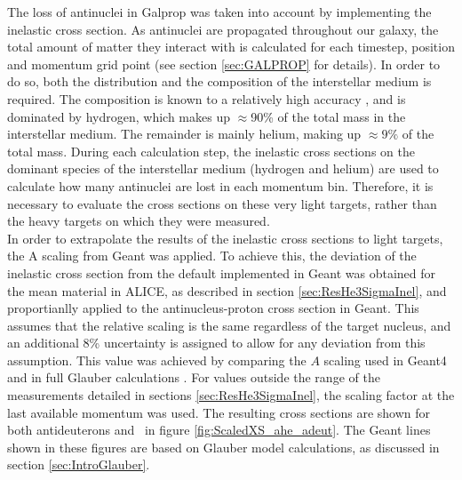 The loss of antinuclei in Galprop was taken into account by implementing the inelastic cross section. As antinuclei are propagated throughout our galaxy, the total amount of matter they interact with is calculated for each timestep, position and momentum grid point (see section \ref{sec:GALPROP} for details). In order to do so, both the distribution and the composition of the interstellar medium is required. The composition is known to a relatively high accuracy \cite{ISM_composition}, and is dominated by hydrogen, which makes up $\approx$90\% of the total mass in the interstellar medium. The remainder is mainly helium, making up $\approx 9\%$ of the total mass. During each calculation step, the inelastic cross sections on the dominant species of the interstellar medium (hydrogen and helium) are used to calculate how many antinuclei are lost in each momentum bin. Therefore, it is necessary to evaluate the cross sections on these very light targets, rather than the heavy targets on which they were measured.\\

In order to extrapolate the results of the inelastic cross sections to light targets, the A scaling from Geant was applied. To achieve this, the deviation of the inelastic cross section from the default implemented in Geant was obtained for the mean material in ALICE, as described in section \ref{sec:ResHe3SigmaInel}, and proportianlly applied to the antinucleus-proton cross section in Geant. This assumes that the relative scaling is the same regardless of the target nucleus, and an additional 8\% uncertainty is assigned to allow for any deviation from this assumption. This value was achieved by comparing the $A$ scaling used in Geant4 and in full Glauber calculations \cite{antiHe3XS, glauber_model_geant4_scaling}. For values outside the range of the measurements detailed in sections \ref{sec:ResHe3SigmaInel}, the scaling factor at the last available momentum was used.
The resulting cross sections are shown for both antideuterons and \ahe\ in figure \ref{fig:ScaledXS_ahe_adeut}. The Geant lines shown in these figures are based on Glauber model calculations, as discussed in section \ref{sec:IntroGlauber}.

